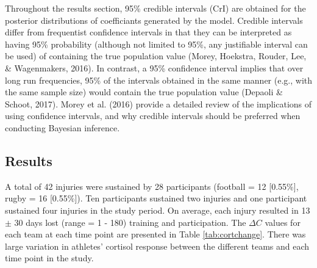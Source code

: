 \documentclass[man,floatsintext]{apa6}
\begin{document}
Throughout the results section, 95\% credible intervals (CrI) are obtained for the posterior distributions of coefficiants generated by the model.
Credible intervals differ from frequentist confidence intervals in that they can be interpreted as having 95\% probability (although not limited to 95\%, any justifiable interval can be used) of containing the true population value (Morey, Hoekstra, Rouder, Lee, \& Wagenmakers, 2016).
In contrast, a 95\% confidence interval implies that over long run frequencies, 95\% of the intervals obtained in the same manner (e.g., with the same sample size) would contain the true population value (Depaoli \& Schoot, 2017).
Morey et al. (2016) provide a detailed review of the implications of using confidence intervals, and why credible intervals should be preferred when conducting Bayesian inference.

\hypertarget{results-3}{%
\subsection{Results}\label{results-3}}

A total of 42 injuries were sustained by 28 participants (football = 12 {[}0.55\%{]}, rugby = 16 {[}0.55\%{]}).
Ten participants sustained two injuries and one participant sustained four injuries in the study period. On average, each injury resulted in 13 \(\pm\) 30 days lost (range = 1 - 180) training and participation.
The \(\Delta C\) values for each team at each time point are presented in Table \ref{tab:cortchange}.
There was large variation in athletes' cortisol response between the different teams and each time point in the study.
\end{document}
